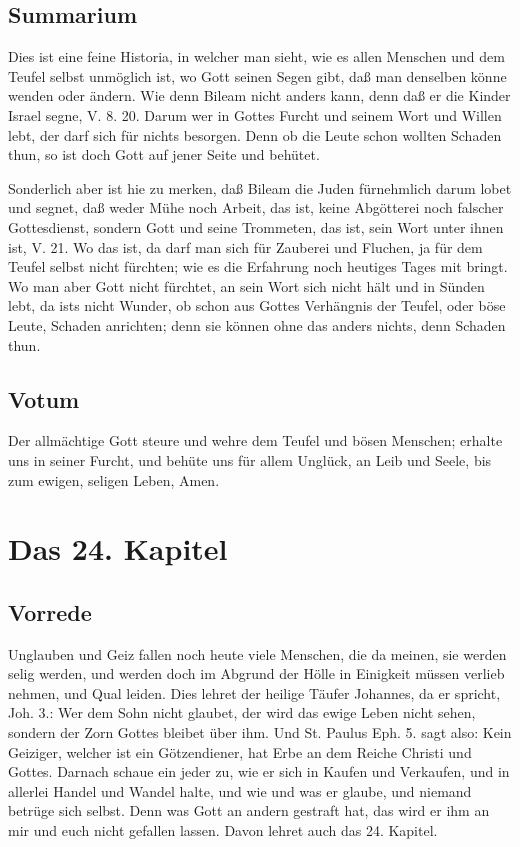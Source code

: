 \section{Summarium}

Dies ist eine feine Historia, in welcher man sieht, wie es allen Menschen und dem Teufel selbst unmöglich ist, wo Gott seinen Segen gibt, daß man denselben könne wenden oder ändern. Wie denn Bileam nicht anders kann, denn daß er die Kinder Israel segne, V. 8. 20. Darum wer in Gottes Furcht und seinem Wort und Willen lebt, der darf sich für nichts besorgen. Denn ob die Leute schon wollten Schaden thun, so ist doch Gott auf jener Seite und behütet.

Sonderlich aber ist hie zu merken, daß Bileam die Juden fürnehmlich darum lobet und segnet, daß weder Mühe noch Arbeit, das ist, keine Abgötterei noch falscher Gottesdienst, sondern Gott und seine Trommeten, das ist, sein Wort unter ihnen ist, V. 21. Wo das ist, da darf man sich für Zauberei und Fluchen, ja für dem Teufel selbst nicht fürchten; wie es die Erfahrung noch heutiges Tages mit bringt. Wo man aber Gott nicht fürchtet, an sein Wort sich nicht hält und in Sünden lebt, da ists nicht Wunder, ob schon aus Gottes Verhängnis der Teufel, oder böse Leute, Schaden anrichten; denn sie können ohne das anders nichts, denn Schaden thun.

\section{Votum}

Der allmächtige Gott steure und wehre dem Teufel und bösen Menschen; erhalte uns in seiner Furcht, und behüte uns für allem Unglück, an Leib und Seele, bis zum ewigen, seligen Leben, Amen.

\chapter{Das 24. Kapitel}

\section{Vorrede}

Unglauben und Geiz fallen noch heute viele Menschen, die da meinen, sie werden selig werden, und werden doch im Abgrund der Hölle in
Einigkeit müssen verlieb nehmen, und Qual leiden. Dies lehret der heilige Täufer Johannes, da er spricht, Joh. 3.: Wer dem Sohn nicht glaubet, der wird das ewige Leben nicht sehen, sondern der Zorn Gottes bleibet über ihm. Und St. Paulus Eph. 5. sagt also: Kein Geiziger, welcher ist ein Götzendiener, hat Erbe an dem Reiche Christi und Gottes. Darnach schaue ein jeder zu, wie er sich in Kaufen und Verkaufen, und in allerlei Handel und Wandel halte, und wie und was er glaube, und niemand betrüge sich selbst. Denn was Gott an andern gestraft hat, das wird er ihm an mir und euch nicht gefallen lassen. Davon lehret auch das 24. Kapitel.

